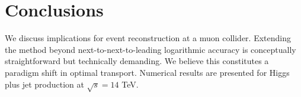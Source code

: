 \section{Conclusions}\label{sec:conclusions}

We discuss implications for event reconstruction at a muon collider.
Extending the method beyond next-to-next-to-leading logarithmic accuracy
is conceptually straightforward but technically demanding. We believe
this constitutes a paradigm shift in optimal transport. Numerical
results are presented for Higgs plus jet production at $\sqrt{s} = 14$
TeV.


